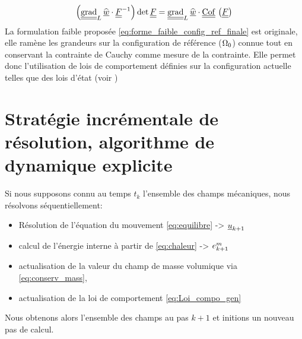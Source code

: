 \documentclass[10pt]{book}
\begin{document}
\begin{equation}
\left(\tgrad_{L}\DepVirt\cdot\GT^{-1}\right)\det\GT=\tgrad_{L}\DepVirt\cdot\Cof\left(\GT\right)
\label{eq:defo_conjug_cofac}
\end{equation}
La formulation faible proposée \eqref{eq:forme_faible_config_ref_finale} est originale, elle ramène les grandeurs sur la configuration de référence ($\Omega_{0}$) connue tout en conservant la contrainte de Cauchy comme mesure de la contrainte. Elle permet donc l'utilisation de lois de comportement définies sur la configuration \og actuelle \fg{} telles que des lois d'état (voir )
\section{Stratégie incrémentale de résolution, algorithme de dynamique explicite}\label{Section:Stratégie incrémentale de résolution, algorithme de dynamique explicite}
Si nous supposons connu au temps $t_{k}$ l'ensemble des champs mécaniques, nous résolvons séquentiellement:
\begin{itemize}
\item Résolution de l'équation du mouvement \eqref{eq:equilibre} -> $\underline{u}_{k+1}$
\item calcul de l'énergie interne à partir de \eqref{eq:chaleur} -> $e^{m}_{k+1}$ 
\item actualisation de la valeur du champ de masse volumique via \eqref{eq:conserv_mass}, 
\item actualisation de la loi de comportement \eqref{eq:Loi_compo_gen}
\end{itemize}
Nous obtenons alors l'ensemble des champs au pas $k+1$ et initions un nouveau pas de calcul.
\end{document}
